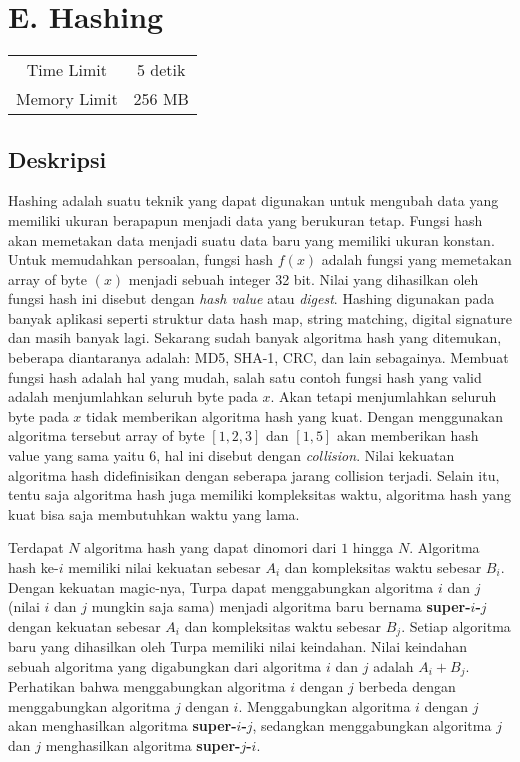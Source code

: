 \documentclass{article}
\begin{document}
\section*{\hfil E. Hashing\hfil}

\begin{center}
\begin{tabular}{ |cc| } 
 \hline
 Time Limit & 5 detik \\ 
 Memory Limit & 256 MB \\
 \hline
\end{tabular}
\end{center}

\subsection*{Deskripsi}

\par Hashing adalah suatu teknik yang dapat digunakan untuk mengubah data yang memiliki ukuran berapapun menjadi data yang berukuran tetap. Fungsi hash akan memetakan data menjadi suatu data baru yang memiliki ukuran konstan. Untuk memudahkan persoalan, fungsi hash $f(x)$ adalah fungsi yang memetakan array of byte $(x)$ menjadi sebuah integer 32 bit. Nilai yang dihasilkan oleh fungsi hash ini disebut dengan \textit{hash value} atau \textit{digest}. Hashing digunakan pada banyak aplikasi seperti struktur data hash map, string matching, digital signature dan masih banyak lagi. Sekarang sudah banyak algoritma hash yang ditemukan, beberapa diantaranya adalah: MD5, SHA-1, CRC, dan lain sebagainya. Membuat fungsi hash adalah hal yang mudah, salah satu contoh fungsi hash yang valid adalah menjumlahkan seluruh byte pada $x$. Akan tetapi menjumlahkan seluruh byte pada $x$ tidak memberikan algoritma hash yang kuat. Dengan menggunakan algoritma tersebut array of byte $[1,2,3]$ dan $[1,5]$ akan memberikan hash value yang sama yaitu $6$, hal ini disebut dengan \textit{collision}. Nilai kekuatan algoritma hash didefinisikan dengan seberapa jarang collision terjadi. Selain itu, tentu saja algoritma hash juga memiliki kompleksitas waktu, algoritma hash yang kuat bisa saja membutuhkan waktu yang lama.

\par Terdapat $N$ algoritma hash yang dapat dinomori dari $1$ hingga $N$. Algoritma hash ke-$i$ memiliki nilai kekuatan sebesar $A_i$ dan kompleksitas waktu sebesar $B_i$. Dengan kekuatan magic-nya, Turpa dapat menggabungkan algoritma $i$ dan $j$ (nilai $i$ dan $j$ mungkin saja sama) menjadi algoritma baru bernama \textbf{super-$i$-$j$} dengan kekuatan sebesar $A_i$ dan kompleksitas waktu sebesar $B_j$. Setiap algoritma baru yang dihasilkan oleh Turpa memiliki nilai keindahan. Nilai keindahan sebuah algoritma yang digabungkan dari algoritma $i$ dan $j$ adalah $A_i + B_j$. Perhatikan bahwa menggabungkan algoritma $i$ dengan $j$ berbeda dengan menggabungkan algoritma $j$ dengan $i$. Menggabungkan algoritma $i$ dengan $j$ akan menghasilkan algoritma \textbf{super-$i$-$j$}, sedangkan menggabungkan algoritma $j$ dan $j$ menghasilkan algoritma \textbf{super-$j$-$i$}.
\end{document}
